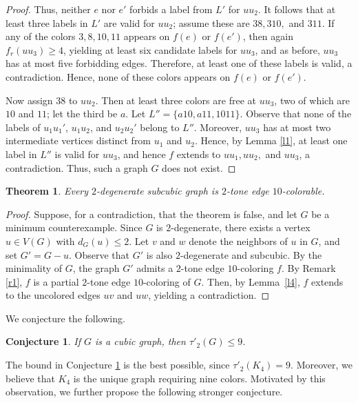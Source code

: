 \documentclass[12pt]{article}
\theoremstyle{plain}
\newtheorem{theorem}{Theorem}
\numberwithin{theorem}{section}
\newtheorem{conjecture}{Conjecture}
\numberwithin{conjecture}{section}
\numberwithin{corollary}{section}
\numberwithin{example}{section}
\numberwithin{lemma}{section}
\numberwithin{proposition}{section}
\numberwithin{problem}{section}
\numberwithin{remark}{section}
\numberwithin{claim}{theorem}
\numberwithin{definition}{section}
\begin{document}
\begin{proof}
\noindent Thus, neither $e$ nor $e'$ forbids a label from $L'$ for $uu_2$. It follows that at least three labels in $L'$ are valid for $uu_2$; assume these are $38, 310,$ and $311$. If any of the colors $3,8,10,11$ appears on $f(e)$ or $f(e')$, then again $f_r(uu_3)\ge 4$, yielding at least six candidate labels for $uu_3$, and as before, $uu_3$ has at most five forbidding edges. Therefore, at least one of these labels is valid, a contradiction. Hence, none of these colors appears on $f(e)$ or $f(e')$.

Now assign $38$ to $uu_2$. Then at least three colors are free at $uu_3$, two of which are $10$ and $11$; let the third be $a$. Let $L'' = \{a10, a11, 1011\}$. Observe that none of the labels of $u_1u_1'$, $u_1u_2$, and $u_2u_2'$ belong to $L''$. Moreover, $uu_3$ has at most two intermediate vertices distinct from $u_1$ and $u_2$. Hence, by Lemma \ref{l1}, at least one label in $L''$ is valid for $uu_3$, and hence $f$ extends to  $uu_1, uu_2,$ and $uu_3$, a contradiction. Thus, such a graph $G$ does not exist.\end{proof}

\begin{theorem}
Every $2$-degenerate subcubic graph is $2$-tone edge $10$-colorable.
\end{theorem}

\begin{proof}
Suppose, for a contradiction, that the theorem is false, and let $G$ be a minimum counterexample. Since $G$ is $2$-degenerate, there exists a vertex $u\in V(G)$ with $d_G(u)\le2$. Let $v$ and $w$ denote the neighbors of $u$ in $G$, and set $G'=G-u$. Observe that $G'$ is also $2$-degenerate and subcubic. By the minimality of $G$, the graph $G'$ admits a $2$-tone edge $10$-coloring $f$. By Remark \ref{r1}, $f$ is a partial $2$-tone edge $10$-coloring of $G$. Then, by Lemma~\ref{l4}, $f$ extends to the uncolored edges $uv$ and $uw$, yielding a contradiction.\end{proof}

We conjecture the following.

\begin{conjecture}\label{c1}
If $G$ is a cubic graph, then $\tau'_2(G)\le 9$.
\end{conjecture}

The bound in Conjecture \ref{c1} is the best possible, since $\tau'_2(K_4)=9$. Moreover, we believe that $K_4$ is the unique graph requiring nine colors. Motivated by this observation, we further propose the following stronger conjecture.
\end{document}

